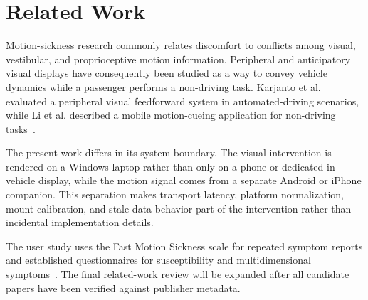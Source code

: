 \section{Related Work}
\label{sec:related-work}

Motion-sickness research commonly relates discomfort to conflicts among visual, vestibular, and proprioceptive motion information. Peripheral and anticipatory visual displays have consequently been studied as a way to convey vehicle dynamics while a passenger performs a non-driving task. Karjanto et al. evaluated a peripheral visual feedforward system in automated-driving scenarios, while Li et al. described a mobile motion-cueing application for non-driving tasks~\cite{karjanto2018feedforward,li2023mosi}.

The present work differs in its system boundary. The visual intervention is rendered on a Windows laptop rather than only on a phone or dedicated in-vehicle display, while the motion signal comes from a separate Android or iPhone companion. This separation makes transport latency, platform normalization, mount calibration, and stale-data behavior part of the intervention rather than incidental implementation details.

The user study uses the Fast Motion Sickness scale for repeated symptom reports and established questionnaires for susceptibility and multidimensional symptoms~\cite{keshavarz2011fms,golding2006mssq,gianaros2001msaq}. The final related-work review will be expanded after all candidate papers have been verified against publisher metadata.
